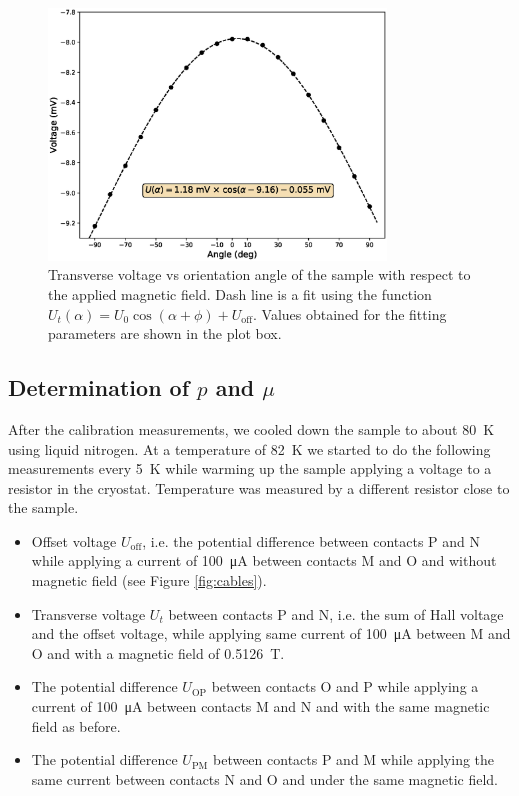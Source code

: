 \documentclass[11pt,a4paper]{article}
\begin{document}
\begin{figure}[H]
\centering
\includegraphics[width=0.8\textwidth]{Voltage_vs_angle.eps}
\caption{Transverse voltage vs orientation angle of the sample with respect to the applied magnetic field. Dash line is a fit using the function $U_t(\alpha)=U_0\cos(\alpha+\phi) + U_\text{off}$. Values obtained for the fitting parameters are shown in the plot box.}
\label{fig:orientation}
\end{figure}

\subsection{Determination of $p$ and $\mu$}

After the calibration measurements, we cooled down the sample to about \SI{80}{\kelvin} using liquid nitrogen. At a temperature of \SI{82}{\kelvin} we started to do the following measurements every \SI{5}{\kelvin} while warming up the sample applying a voltage to a resistor in the cryostat. Temperature was measured by a different resistor close to the sample.
\begin{itemize}
\item Offset voltage $U_\text{off}$, i.e. the potential difference between contacts P and N while applying a current of \SI{100}{\micro\ampere} between contacts M and O and without magnetic field (see Figure \ref{fig:cables}).
\item Transverse voltage $U_t$ between contacts P and N, i.e. the sum of Hall voltage and the offset voltage, while applying same current of \SI{100}{\micro\ampere} between M and O and with a magnetic field of \SI{0.5126}{\tesla}.
\item The potential difference $U_\text{OP}$ between contacts O and P while applying a current of \SI{100}{\micro\ampere} between contacts M and N and with the same magnetic field as before.
\item The potential difference $U_\text{PM}$ between contacts P and M while applying the same current between contacts N and O and under the same magnetic field.
\end{itemize}
\end{document}
